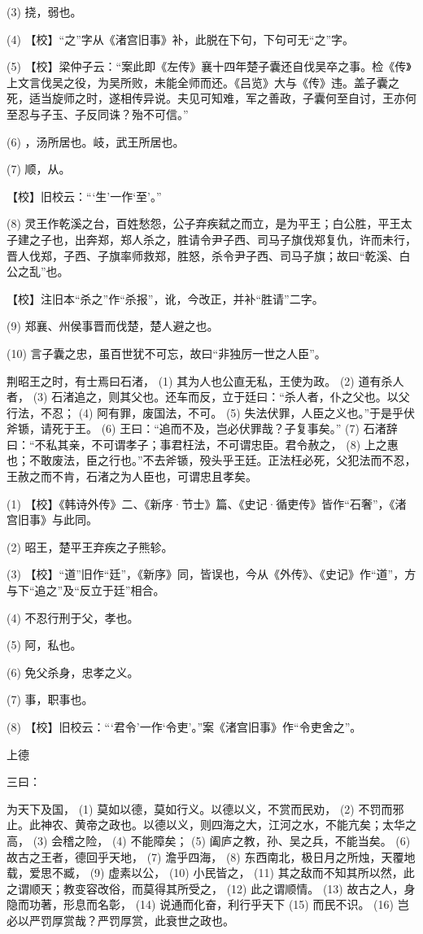 \documentclass[12pt,UTF8]{ctexbook}
\begin{document}
(3) 挠，弱也。

(4) 【校】“之”字从《渚宫旧事》补，此脱在下句，下句可无“之”字。

(5) 【校】梁仲子云：“案此即《左传》襄十四年楚子囊还自伐吴卒之事。检《传》上文言伐吴之役，为吴所败，未能全师而还。《吕览》大与《传》违。盖子囊之死，适当旋师之时，遂相传异说。夫见可知难，军之善政，子囊何至自讨，王亦何至忍与子玉、子反同诛？殆不可信。”

(6) ，汤所居也。岐，武王所居也。

(7) 顺，从。

【校】旧校云：“‘生’一作‘至’。”

(8) 灵王作乾溪之台，百姓愁怨，公子弃疾弑之而立，是为平王；白公胜，平王太子建之子也，出奔郑，郑人杀之，胜请令尹子西、司马子旗伐郑复仇，许而未行，晋人伐郑，子西、子旗率师救郑，胜怒，杀令尹子西、司马子旗；故曰“乾溪、白公之乱”也。

【校】注旧本“杀之”作“杀报”，讹，今改正，并补“胜请”二字。

(9) 郑襄、州侯事晋而伐楚，楚人避之也。

(10) 言子囊之忠，虽百世犹不可忘，故曰“非独厉一世之人臣”。

荆昭王之时，有士焉曰石渚， (1) 其为人也公直无私，王使为政。 (2) 道有杀人者， (3) 石渚追之，则其父也。还车而反，立于廷曰：“杀人者，仆之父也。以父行法，不忍； (4) 阿有罪，废国法，不可。 (5) 失法伏罪，人臣之义也。”于是乎伏斧锧，请死于王。 (6) 王曰：“追而不及，岂必伏罪哉？子复事矣。” (7) 石渚辞曰：“不私其亲，不可谓孝子；事君枉法，不可谓忠臣。君令赦之， (8) 上之惠也；不敢废法，臣之行也。”不去斧锧，殁头乎王廷。正法枉必死，父犯法而不忍，王赦之而不肯，石渚之为人臣也，可谓忠且孝矣。

(1) 【校】《韩诗外传》二、《新序·节士》篇、《史记·循吏传》皆作“石奢”，《渚宫旧事》与此同。

(2) 昭王，楚平王弃疾之子熊轸。

(3) 【校】“道”旧作“廷”，《新序》同，皆误也，今从《外传》、《史记》作“道”，方与下“追之”及“反立于廷”相合。

(4) 不忍行刑于父，孝也。

(5) 阿，私也。

(6) 免父杀身，忠孝之义。

(7) 事，职事也。

(8) 【校】旧校云：“‘君令’一作‘令吏’。”案《渚宫旧事》作“令吏舍之”。





上德


三曰：

为天下及国， (1) 莫如以德，莫如行义。以德以义，不赏而民劝， (2) 不罚而邪止。此神农、黄帝之政也。以德以义，则四海之大，江河之水，不能亢矣；太华之高， (3) 会稽之险， (4) 不能障矣； (5) 阖庐之教，孙、吴之兵，不能当矣。 (6) 故古之王者，德回乎天地， (7) 澹乎四海， (8) 东西南北，极日月之所烛，天覆地载，爱思不臧， (9) 虚素以公， (10) 小民皆之， (11) 其之敌而不知其所以然，此之谓顺天；教变容改俗，而莫得其所受之， (12) 此之谓顺情。 (13) 故古之人，身隐而功著，形息而名彰， (14) 说通而化奋，利行乎天下 (15) 而民不识。 (16) 岂必以严罚厚赏哉？严罚厚赏，此衰世之政也。
\end{document}
